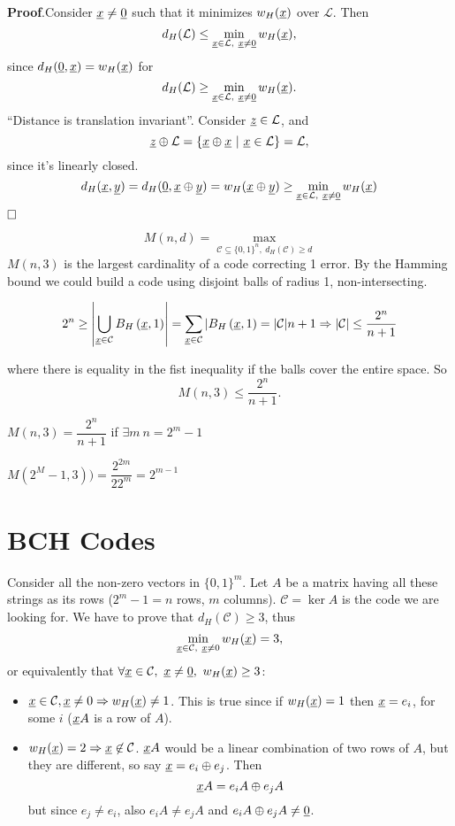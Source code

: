 \noindent\textbf{Proof}.Consider $\underline{x} \not= \underline{0}$ such that it minimizes $w_H(\underline{x})$ over $\mathcal{L}$. Then $$d_H(\mathcal{L}) \leq \min_{\underline{x} \in \mathcal{L},\ \underline{x}\not= \underline{0}}w_H(\underline{x}),$$ since $d_H(\underline{0}, \underline{x}) = w_H(\underline{x})$ for $$d_H(\mathcal{L}) \geq \min_{\underline{x} \in \mathcal{L},\ \underline{x}\not= \underline{0}}w_H(\underline{x}).$$ ``Distance is translation invariant''. Consider $\underline{z} \in \mathcal{L}$, and $$\underline{z} \oplus \mathcal{L} = \{\underline{x} \oplus \underline{x}\ |\ \underline{x}\in \mathcal{L} \} = \mathcal{L},$$ since it's linearly closed.
\[
d_H(\underline{x}, \underline{y}) = d_H(\underline{0}, \underline{x} \oplus \underline{y}) = w_H(\underline{x}\oplus\underline{y}) \geq \min_{\underline{x} \in \mathcal{L},\ \underline{x} \not= \underline{0}} w_H(\underline{x})
\]
$\hfill\Box$

\[
M(n, d) = \max_{\mathcal{C} \subseteq \{0, 1\}^n,\ d_H(\mathcal{C}) \geq d}
\]
$M(n, 3)$ is the largest cardinality of a code correcting 1 error. By the Hamming bound we could build a code using disjoint balls of radius 1, non-intersecting.

\[
2^n \geq \left|\bigcup_{\underline{x}\in \mathcal{C}}B_H\left(\underline{x}, 1\right)\right| = \sum_{\underline{x} \in \mathcal{C}}|B_H\left(\underline{x}, 1\right) = |\mathcal{C}|n + 1 \Rightarrow |\mathcal{C}| \leq \dfrac{2^n}{n+1}
\]

where there is equality in the fist inequality if the balls cover the entire space. So $$M(n, 3) \leq \dfrac{2^n}{n+1}.$$

\begin{thm}[Hamming]
	$M(n, 3) = \dfrac{2^n}{n+1}$ if $\exists m\ n = 2^m -1$	
\end{thm}

$M(2^M-1, 3) ) = \dfrac{2^{2m}}{22^m} = 2^{m-1}$

\section{BCH Codes}
Consider all the non-zero vectors in $\{0, 1\}^m$. Let $A$ be a matrix having all these strings as its rows ($2^m-1 = n$ rows, $m$ columns). $\mathcal{C} = \ker A$ is the code we are looking for. We have to prove that $d_H(\mathcal{C})\geq 3$, thus $$\min_{\str{x} \in \mathcal{C},\ \str{x} \not= 0} w_H(\str{x}) = 3,$$ or equivalently that $\forall \underline{x} \in \mathcal{C},\ \underline{x} \not= \underline{0},\ w_H(\underline{x}) \geq 3$:
\begin{itemize}
	\item $\underline{x} \in \mathcal{C}, \underline{x} \not=0 \Rightarrow w_H(\underline{x}) \not=1$. This is true since if $w_H(\underline{x})=1$ then $\underline{x} = e_i$, for some $i$ ($\underline{x}A$ is a row of $A$).
	\item $w_H(\underline{x}) = 2 \Rightarrow \underline{x} \not \in \mathcal{C}$. $\underline{x}A$ would be a linear combination of two rows of $A$, but they are different, so say $\underline{x} = e_i \oplus e_j$. Then $$\underline{x}A =  e_iA \oplus e_jA$$ but since $e_j \not= e_i$, also $ e_iA \not= e_jA$ and  $e_iA \oplus e_jA \not= \underline{0}$.
\end{itemize}

